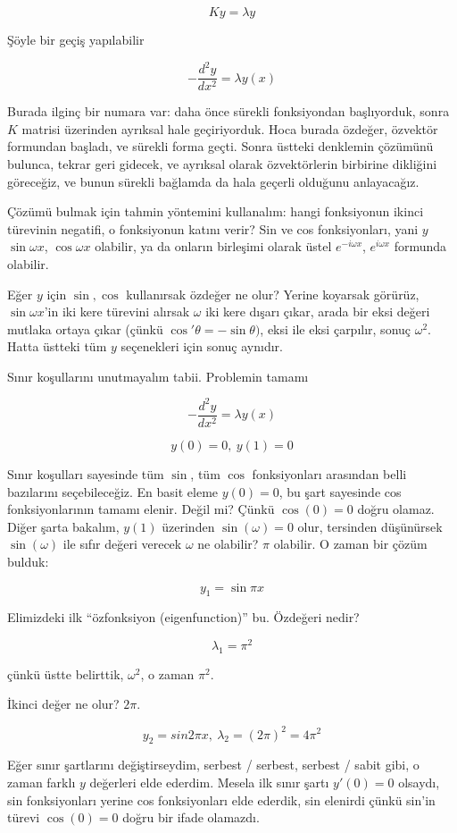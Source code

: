 \documentclass[12pt,fleqn]{article}\usepackage{../../common}
\begin{document}
$$ Ky = \lambda y $$

Şöyle bir geçiş yapılabilir

$$ -\frac{d^2y}{dx^2} = \lambda y(x) $$

Burada ilginç bir numara var: daha önce sürekli fonksiyondan başlıyorduk,
sonra $K$ matrisi üzerinden ayrıksal hale geçiriyorduk. Hoca burada
özdeğer, özvektör formundan başladı, ve sürekli forma geçti. Sonra üstteki
denklemin çözümünü bulunca, tekrar geri gidecek, ve ayrıksal olarak
özvektörlerin birbirine dikliğini göreceğiz, ve bunun sürekli bağlamda da
hala geçerli olduğunu anlayacağız. 

Çözümü bulmak için tahmin yöntemini kullanalım: hangi fonksiyonun ikinci
türevinin negatifi, o fonksiyonun katını verir? Sin ve cos fonksiyonları,
yani $y$ $\sin \omega x$, $\cos \omega x$ olabilir, ya da onların birleşimi
olarak üstel $e^{-i\omega x}$, $e^{i\omega x}$ formunda olabilir.

Eğer $y$ için $\sin, \cos$ kullanırsak özdeğer ne olur? Yerine koyarsak
görürüz, $\sin\omega x$'in iki kere türevini alırsak $\omega$ iki kere
dışarı çıkar, arada bir eksi değeri mutlaka ortaya çıkar (çünkü 
$\cos'\theta = -\sin\theta)$, eksi ile eksi çarpılır, sonuç $\omega^2$. 
Hatta üstteki tüm $y$ seçenekleri için sonuç aynıdır. 
 
Sınır koşullarını unutmayalım tabii. Problemin tamamı

$$ -\frac{d^2y}{dx^2} = \lambda y(x) $$

$$ y(0) = 0, \ y(1) = 0 $$

Sınır koşulları sayesinde tüm $\sin$, tüm $\cos$ fonksiyonları arasından belli
bazılarını seçebileceğiz. En basit eleme $y(0) = 0$, bu şart sayesinde cos
fonksiyonlarının tamamı elenir. Değil mi? Çünkü $\cos(0) = 0$ doğru
olamaz. Diğer şarta bakalım, $y(1)$ üzerinden $\sin(\omega) = 0$ olur,
tersinden düşünürsek $\sin(\omega)$ ile sıfır değeri verecek $\omega$ ne
olabilir? $\pi$ olabilir. O zaman bir çözüm bulduk:

$$ y_1 = \sin \pi x $$

Elimizdeki ilk ``özfonksiyon (eigenfunction)'' bu. Özdeğeri nedir?

$$ \lambda_1 = \pi^2 $$

çünkü üstte belirttik, $\omega^2$, o zaman $\pi^2$. 

İkinci değer ne olur? $2\pi$. 

$$ y_2 = sin2\pi x, \ \lambda_2 = (2\pi)^2 = 4\pi^2 $$

Eğer sınır şartlarını değiştirseydim, serbest / serbest, serbest / sabit
gibi, o zaman farklı $y$ değerleri elde ederdim. Mesela ilk sınır şartı
$y'(0) = 0$ olsaydı, sin fonksiyonları yerine cos fonksiyonları elde
ederdik, sin elenirdi çünkü sin'in türevi $\cos(0) = 0$ doğru bir ifade
olamazdı. 
\end{document}
